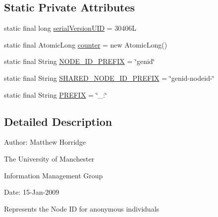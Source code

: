 \subsection*{Static Private Attributes}
\begin{DoxyCompactItemize}
\item 
static final long \hyperlink{classorg_1_1semanticweb_1_1owlapi_1_1model_1_1_node_i_d_a5448e0b893744af13114e0e7abf9dd65}{serial\-Version\-U\-I\-D} = 30406\-L
\item 
static final Atomic\-Long \hyperlink{classorg_1_1semanticweb_1_1owlapi_1_1model_1_1_node_i_d_a8f9355706577a575363bbb4a10b085b5}{counter} = new Atomic\-Long()
\item 
static final String \hyperlink{classorg_1_1semanticweb_1_1owlapi_1_1model_1_1_node_i_d_acb0ec7dfc06f24bd5f1ef7d40859546a}{N\-O\-D\-E\-\_\-\-I\-D\-\_\-\-P\-R\-E\-F\-I\-X} = \char`\"{}genid\char`\"{}
\item 
static final String \hyperlink{classorg_1_1semanticweb_1_1owlapi_1_1model_1_1_node_i_d_a012934597c895689319c2682e5a43242}{S\-H\-A\-R\-E\-D\-\_\-\-N\-O\-D\-E\-\_\-\-I\-D\-\_\-\-P\-R\-E\-F\-I\-X} = \char`\"{}genid-\/nodeid-\/\char`\"{}
\item 
static final String \hyperlink{classorg_1_1semanticweb_1_1owlapi_1_1model_1_1_node_i_d_ace944d1f23618a11bfc6089d1778bd49}{P\-R\-E\-F\-I\-X} = \char`\"{}\-\_\-\-:\char`\"{}
\end{DoxyCompactItemize}


\subsection{Detailed Description}
Author\-: Matthew Horridge\par
 The University of Manchester\par
 Information Management Group\par
 Date\-: 15-\/\-Jan-\/2009 

Represents the Node I\-D for anonymous individuals 

